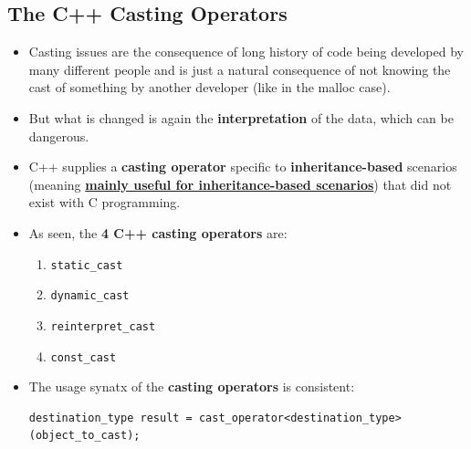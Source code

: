 \documentclass[10pt]{article}
\begin{document}
\subsection{The C++ Casting Operators}
\begin{itemize}
	\item Casting issues are the consequence of long history of code being developed by many different people and is just a natural consequence of not knowing the cast of something by another developer (like in the malloc case).

	\item But what is changed is again the \textbf{interpretation} of the data, which can be dangerous.

	\item C++ supplies a \textbf{casting operator} specific to \textbf{inheritance-based} scenarios \\ 
		(meaning \textbf{\underline{mainly useful for inheritance-based scenarios}}) that did not exist with C programming.

	\item As seen, the \textbf{4 C++ casting operators} are:
		\begin{enumerate}
			\item \verb|static_cast|
			\item \verb|dynamic_cast|
			\item \verb|reinterpret_cast|
			\item \verb|const_cast|
		\end{enumerate}

	\item The usage synatx of the \textbf{casting operators} is consistent:
		\begin{verbatim}
destination_type result = cast_operator<destination_type> (object_to_cast);
		\end{verbatim}
\end{itemize}

\newpage
\end{document}
